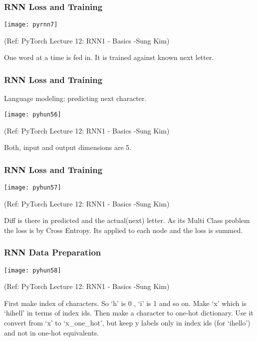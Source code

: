 \begin{frame}[fragile] \frametitle{RNN Loss and Training}

\begin{center}
\texttt{[image: pyrnn7]}

\tiny{(Ref: PyTorch Lecture 12: RNN1 - Basics -Sung Kim)}
\end{center}
One word at a time is fed in. It is trained against known next letter.
\end{frame}

\begin{frame}[fragile] \frametitle{RNN Loss and Training}

Language modeling: predicting next character.

\begin{center}
\texttt{[image: pyhun56]}

\tiny{(Ref: PyTorch Lecture 12: RNN1 - Basics -Sung Kim)}
\end{center}
Both, input and output dimensions are 5. 
\end{frame}

\begin{frame}[fragile] \frametitle{RNN Loss and Training}

\begin{center}
\texttt{[image: pyhun57]}

\tiny{(Ref: PyTorch Lecture 12: RNN1 - Basics -Sung Kim)}
\end{center}

Diff is there in predicted and the actual(next) letter. As its Multi Class problem the loss is by Cross Entropy. Its applied to each node and the loss is summed.
\end{frame}


\begin{frame}[fragile] \frametitle{RNN Data Preparation}

\begin{center}
\texttt{[image: pyhun58]}

\tiny{(Ref: PyTorch Lecture 12: RNN1 - Basics -Sung Kim)}
\end{center}

First make index of characters. So `h' is 0 , `i' is 1 and so on. Make `x' which is `hihell' in terms of index ids. Then make a character to one-hot dictionary. Use it convert from `x' to `x\_one\_hot', but keep y labels only in index ids (for `ihello') and not in one-hot equivalents.
\end{frame}


